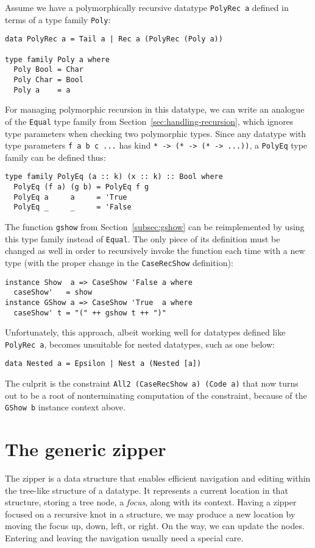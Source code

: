 \documentclass[runningheads]{llncs}
\newcommand{\K}[1]{\lstinline{#1}}
\begin{document}
Assume we have a polymorphically recursive datatype \K{PolyRec a} defined in terms of a type family \K{Poly}:
\begin{lstlisting}
data PolyRec a = Tail a | Rec a (PolyRec (Poly a))

type family Poly a where
  Poly Bool = Char
  Poly Char = Bool
  Poly a    = a
\end{lstlisting}

For managing polymorphic recursion in this datatype, we can write an analogue of the \K{Equal} type family from Section~\ref{sec:handling-recursion}, which ignores type parameters when checking two polymorphic types. Since any datatype with type parameters \K{f a b c ...} has kind \K{* -> (* -> (* -> ...))}, a \K{PolyEq} type family can be defined thus:
\begin{lstlisting}
type family PolyEq (a :: k) (x :: k) :: Bool where
  PolyEq (f a) (g b) = PolyEq f g
  PolyEq a     a     = 'True
  PolyEq _     _     = 'False
\end{lstlisting}

The function \K{gshow} from Section~\ref{subsec:gshow} can be reimplemented by using this type family instead of \K{Equal}. The only piece of its definition must be changed as well in order to recursively invoke the function each time with a new type (with the proper change in the \K{CaseRecShow} definition):
\begin{lstlisting}
instance Show  a => CaseShow 'False a where
  caseShow'   = show
instance GShow a => CaseShow 'True  a where
  caseShow' t = "(" ++ gshow t ++ ")"
\end{lstlisting}

Unfortunately, this approach, albeit working well for datatypes defined like \K{PolyRec a}, becomes unsuitable for nested datatypes, such as one below:
\begin{lstlisting}
data Nested a = Epsilon | Nest a (Nested [a])
\end{lstlisting}
The culprit is the constraint \K{All2 (CaseRecShow a) (Code a)} that now turns out to be a root of nonterminating computation of the constraint, because of the \K{GShow b} instance context above.

\section{The generic zipper}
\label{sec:generic-zipper}

The zipper is a data structure that enables efficient navigation and editing within the tree-like structure of a datatype. It represents a current location in that structure, storing a tree node, a \emph{focus}, along with its context. Having a zipper focused on a recursive knot in a structure, we may produce a new location by moving the focus up, down, left, or right. On the way, we can update the nodes. Entering and leaving the navigation usually need a special care.
\end{document}
